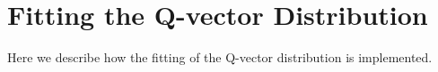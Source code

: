 \section{Fitting the Q-vector Distribution}
\label{qfit}
Here we describe how the fitting of the Q-vector distribution is implemented.
